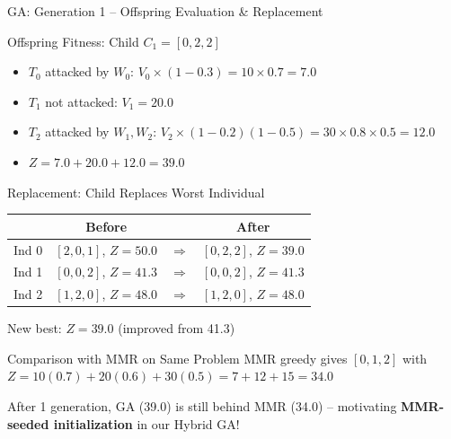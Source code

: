 \documentclass[aspectratio=43,8pt]{beamer}
\begin{document}
\begin{frame}{GA: Generation 1 -- Offspring Evaluation \& Replacement}
\begin{block}{Offspring Fitness: Child $C_1 = [0, 2, 2]$}
\begin{itemize}
    \item $T_0$ attacked by $W_0$: $V_0 \times (1-0.3) = 10 \times 0.7 = 7.0$
    \item $T_1$ not attacked: $V_1 = 20.0$
    \item $T_2$ attacked by $W_1, W_2$: $V_2 \times (1-0.2)(1-0.5) = 30 \times 0.8 \times 0.5 = 12.0$
    \item $Z = 7.0 + 20.0 + 12.0 = \mathbf{39.0}$ 
\end{itemize}
\end{block}

\vspace{0.2cm}
\begin{alertblock}{Replacement: Child Replaces Worst Individual}
\begin{center}
\begin{tabular}{lccc}
\toprule
& \textbf{Before} & & \textbf{After} \\
\midrule
Ind 0 & $[2,0,1]$, $Z = 50.0$ & $\Rightarrow$ & \textcolor{green!60!black}{$[0,2,2]$, $Z = \mathbf{39.0}$} \\
Ind 1 & $[0,0,2]$, $Z = 41.3$ & $\Rightarrow$ & $[0,0,2]$, $Z = 41.3$ \\
Ind 2 & $[1,2,0]$, $Z = 48.0$ & $\Rightarrow$ & $[1,2,0]$, $Z = 48.0$ \\
\bottomrule
\end{tabular}
\end{center}
New best: $Z = 39.0$ (improved from 41.3)
\end{alertblock}

\vspace{0.2cm}
\begin{exampleblock}{Comparison with MMR on Same Problem}
MMR greedy gives $[0, 1, 2]$ with $Z = 10(0.7) + 20(0.6) + 30(0.5) = 7 + 12 + 15 = \mathbf{34.0}$

\vspace{0.1cm}
After 1 generation, GA (39.0) is still behind MMR (34.0) -- motivating \textbf{MMR-seeded initialization} in our Hybrid GA!
\end{exampleblock}
\end{frame}
\end{document}
